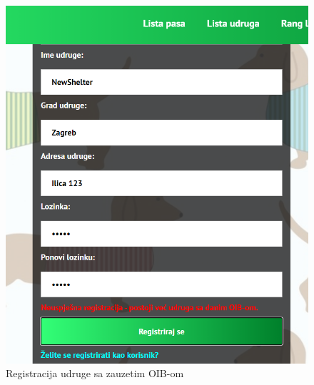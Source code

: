 			 \begin{figure}[H]
			 	\centerline{
			 	\includegraphics[scale=0.65]{slike/OIBError.PNG}}
			 	\caption{Registracija udruge sa zauzetim OIB-om}
			 	\label{fig:wrongOIB}
			 	\centering
			 \end{figure}
